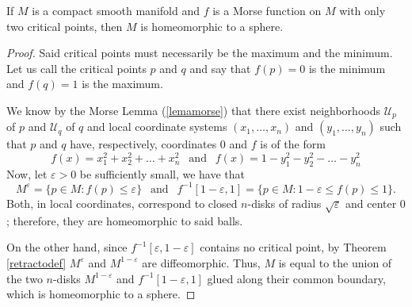 \begin{theorem}\label{reeb}
    If $M$ is a compact smooth manifold and $f$ is a Morse function on $M$ with only two critical points, then $M$ is homeomorphic to a sphere.
\end{theorem}
\begin{proof}
    Said critical points must necessarily be the maximum and the minimum. Let us call the critical points $p$ and $q$ and say that $f(p)=0$ is the minimum and $f(q)=1$ is the maximum.

    We know by the Morse Lemma (\ref{lemamorse}) that there exist neighborhoods $\mathcal{U}_p$ of $p$ and $\mathcal{U}_q$ of $q$ and local coordinate systems $(x_1,\dots,x_n)$ and $(y_1,\dots,y_n)$ such that $p$ and $q$ have, respectively, coordinates $0$ and $f$ is of the form
    \begin{equation*}
        f(x) = x_1^2+x_2^2+\dots+x_n^2~~\text{ and }~~ f(x)=1-y_1^2- y_2^2-\dots-y_n^2 %
    \end{equation*}
    Now, let $\varepsilon > 0$ be sufficiently small, we have that
    \begin{equation*}
        M^{\varepsilon} = \{p\in M \colon f(p)\le \varepsilon\} ~~\text{ and }~~ f^{-1}[1-\varepsilon,1] = \{p\in M \colon 1-\varepsilon \le f(p)\le 1\}.
    \end{equation*}
    Both, in local coordinates, correspond to closed $n$-disks of radius $\sqrt{\varepsilon}$ and center $0$; therefore, they are homeomorphic to said balls.

    On the other hand, since $f^{-1}[\varepsilon, 1-\varepsilon]$ contains no critical point, by Theorem \ref{retractodef} $M^{\varepsilon}$ and $M^{1-\varepsilon}$ are diffeomorphic. Thus, $M$ is equal to the union of the two $n$-disks $M^{1-\varepsilon}$ and $f^{-1}[1-\varepsilon,1]$ glued along their common boundary, which is homeomorphic to a sphere.

\end{proof}
\vspace{-1em}
